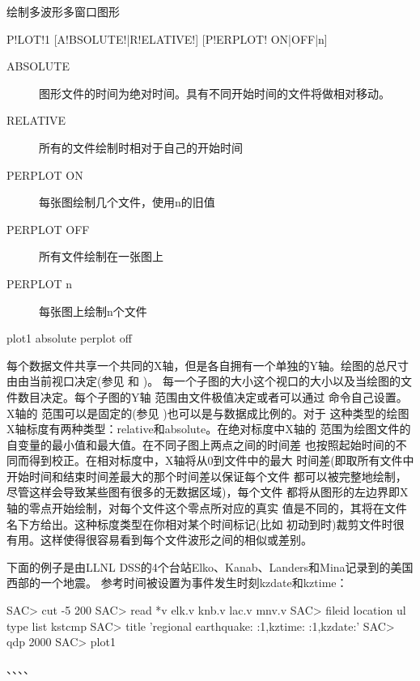 \label{cmd:plot1}

绘制多波形多窗口图形

\begin{SACSTX}
P!LOT!1 [A!BSOLUTE!|R!ELATIVE!] [P!ERPLOT! ON|OFF|n]
\end{SACSTX}

\begin{description}
\item [ABSOLUTE] 图形文件的时间为绝对时间。具有不同开始时间的文件将做相对移动。
\item [RELATIVE] 所有的文件绘制时相对于自己的开始时间
\item [PERPLOT ON] 每张图绘制几个文件，使用n的旧值
\item [PERPLOT OFF] 所有文件绘制在一张图上
\item [PERPLOT n] 每张图上绘制n个文件
\end{description}

\begin{SACDFT}
plot1 absolute perplot off
\end{SACDFT}

每个数据文件共享一个共同的X轴，但是各自拥有一个单独的Y轴。绘图的总尺寸
由由当前视口决定(参见  和 )。
每一个子图的大小这个视口的大小以及当绘图的文件数目决定。每个子图的Y轴
范围由文件极值决定或者可以通过  命令自己设置。X轴的
范围可以是固定的(参见 )也可以是与数据成比例的。对于
这种类型的绘图X轴标度有两种类型：relative和absolute。在绝对标度中X轴的
范围为绘图文件的自变量的最小值和最大值。在不同子图上两点之间的时间差
也按照起始时间的不同而得到校正。在相对标度中，X轴将从0到文件中的最大
时间差(即取所有文件中开始时间和结束时间差最大的那个时间差以保证每个文件
都可以被完整地绘制，尽管这样会导致某些图有很多的无数据区域)，每个文件
都将从图形的左边界即X轴的零点开始绘制，对每个文件这个零点所对应的真实
值是不同的，其将在文件名下方给出。这种标度类型在你相对某个时间标记(比如
初动到时)裁剪文件时很有用。这样使得很容易看到每个文件波形之间的相似或差别。

下面的例子是由LLNL DSS的4个台站Elko、Kanab、Landers和Mina记录到的美国西部的一个地震。
参考时间被设置为事件发生时刻kzdate和kztime：
\begin{SACCode}
SAC> cut -5 200
SAC> read *v
 elk.v knb.v lac.v mnv.v
SAC> fileid location ul type list kstcmp
SAC> title 'regional earthquake:  :1,kztime:  :1,kzdate:'
SAC> qdp 2000
SAC> plot1
\end{SACCode}

、、、、

